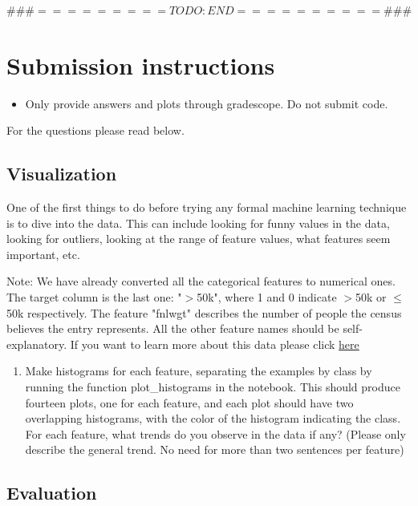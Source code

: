  $\#\#\# ========= TODO :  END   ========== \#\#\#$
\\

\ifsoln
\else
\clearpage
\fi

\ifsoln
\else
\section*{Submission instructions}
\begin{itemize}
\item Only provide answers and plots through gradescope. Do not submit code.
\end{itemize}
\fi

For the questions please read below.

\subsection{Visualization }
One of the first things to do before trying any formal machine learning technique is to dive into the data. This can include looking for funny values in the data, looking for outliers, looking at the range of feature values, what features seem important, etc.

Note: We have already converted all the categorical features to numerical ones. The target column is the last one: "$>$50k", where 1 and 0 indicate $>$50k or $\le$ 50k respectively. The feature "fnlwgt" describes the number of people the census believes the entry represents. All the other feature names should be self-explanatory. If you want to learn more about this data please click  \href{https://archive.ics.uci.edu/ml/datasets/adult}{here}

\begin{enumerate}
\item {} Make histograms for each feature, separating the examples by class by running the function plot\_histograms in the notebook. This should produce fourteen plots, one for each feature, and each plot should have two overlapping histograms, with the color of the histogram indicating the class. For each feature, what trends do you observe in the data if any? (Please only describe the general trend. No need for more than two sentences per feature) 

\sol{}

\end{enumerate}

\ifsolution{\newpage}
\subsection{Evaluation }

